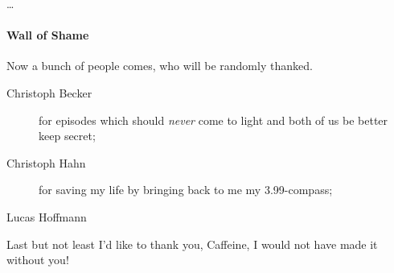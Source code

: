 

\begin{acknowledgements}
\dots{}

\paragraph{Wall of Shame}
Now a bunch of people comes, who will be randomly thanked.

\begin{description}
	\item[Christoph Becker] for episodes which should \emph{never} come to light and both of us be better keep secret; 
	\item[Christoph Hahn] for saving my life by bringing back to me my \SI{3.99}{\EUR}-compass;
	\item[Lucas Hoffmann]
\end{description}



Last but not least I'd like to thank you, Caffeine, I would not have made it without you!

%
\end{acknowledgements}
